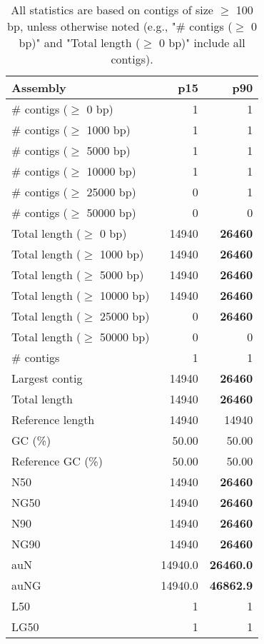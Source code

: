 \documentclass[12pt,a4paper]{article}
\begin{document}
\begin{table}[ht]
\begin{center}
\caption{All statistics are based on contigs of size $\geq$ 100 bp, unless otherwise noted (e.g., "\# contigs ($\geq$ 0 bp)" and "Total length ($\geq$ 0 bp)" include all contigs).}
\begin{tabular}{|l*{2}{|r}|}
\hline
Assembly & p15 & p90 \\ \hline
\# contigs ($\geq$ 0 bp) & 1 & 1 \\ \hline
\# contigs ($\geq$ 1000 bp) & 1 & 1 \\ \hline
\# contigs ($\geq$ 5000 bp) & 1 & 1 \\ \hline
\# contigs ($\geq$ 10000 bp) & 1 & 1 \\ \hline
\# contigs ($\geq$ 25000 bp) & 0 & 1 \\ \hline
\# contigs ($\geq$ 50000 bp) & 0 & 0 \\ \hline
Total length ($\geq$ 0 bp) & 14940 & {\bf 26460} \\ \hline
Total length ($\geq$ 1000 bp) & 14940 & {\bf 26460} \\ \hline
Total length ($\geq$ 5000 bp) & 14940 & {\bf 26460} \\ \hline
Total length ($\geq$ 10000 bp) & 14940 & {\bf 26460} \\ \hline
Total length ($\geq$ 25000 bp) & 0 & {\bf 26460} \\ \hline
Total length ($\geq$ 50000 bp) & 0 & 0 \\ \hline
\# contigs & 1 & 1 \\ \hline
Largest contig & 14940 & {\bf 26460} \\ \hline
Total length & 14940 & {\bf 26460} \\ \hline
Reference length & 14940 & 14940 \\ \hline
GC (\%) & 50.00 & 50.00 \\ \hline
Reference GC (\%) & 50.00 & 50.00 \\ \hline
N50 & 14940 & {\bf 26460} \\ \hline
NG50 & 14940 & {\bf 26460} \\ \hline
N90 & 14940 & {\bf 26460} \\ \hline
NG90 & 14940 & {\bf 26460} \\ \hline
auN & 14940.0 & {\bf 26460.0} \\ \hline
auNG & 14940.0 & {\bf 46862.9} \\ \hline
L50 & 1 & 1 \\ \hline
LG50 & 1 & 1 \\ \hline

\end{tabular}
\end{center}
\end{table}
\end{document}
